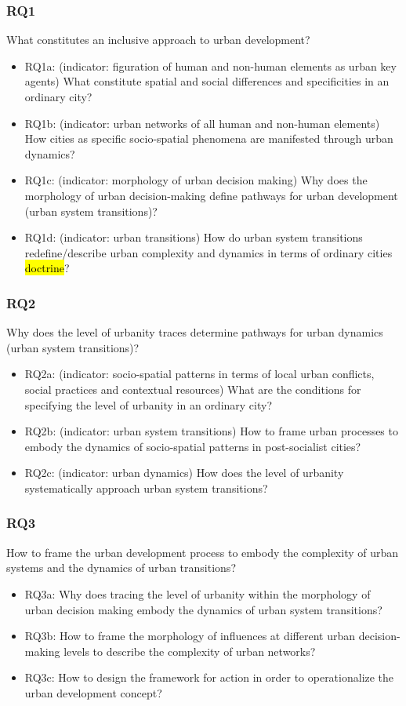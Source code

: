 \documentclass[11pt]{report}
\begin{document}
\subsubsection{RQ1}
What constitutes an inclusive approach to urban development?
\begin{itemize}
\item RQ1a: (indicator: figuration of human and non-human elements as urban key agents) What constitute spatial and social differences and specificities in an ordinary city? 
\item RQ1b: (indicator: urban networks of all human and non-human elements) How cities as specific socio-spatial phenomena are manifested through urban dynamics?
\item RQ1c: (indicator: morphology of urban decision making) Why does the morphology of urban decision-making define pathways for urban development (urban system transitions)?
\item RQ1d: (indicator: urban transitions) How do urban system transitions redefine/describe urban complexity and dynamics in terms of ordinary cities \hl{doctrine}?
\end {itemize}

\subsubsection{RQ2}
Why does the level of urbanity traces determine pathways for urban dynamics (urban system transitions)? 
\begin{itemize}
\item RQ2a: (indicator: socio-spatial patterns in terms of local urban conflicts, social practices and contextual resources) What are the conditions for specifying the level of urbanity in an ordinary city?
\item RQ2b: (indicator: urban system transitions) How to frame urban processes to embody the dynamics of socio-spatial patterns in post-socialist cities?
\item RQ2c: (indicator: urban dynamics) How does the level of urbanity systematically approach urban system transitions?
\end {itemize}

\subsubsection{RQ3}
How to frame the urban development process to embody the complexity of urban systems and the dynamics of urban transitions?
\begin{itemize}
\item RQ3a: Why does tracing the level of urbanity within the morphology of urban decision making embody the dynamics of urban system transitions?
\item RQ3b: How to frame the morphology of influences at different urban decision-making levels to describe the complexity of urban networks?
\item RQ3c: How to design the framework for action in order to operationalize the urban development concept?
\end {itemize}
\end{document}
